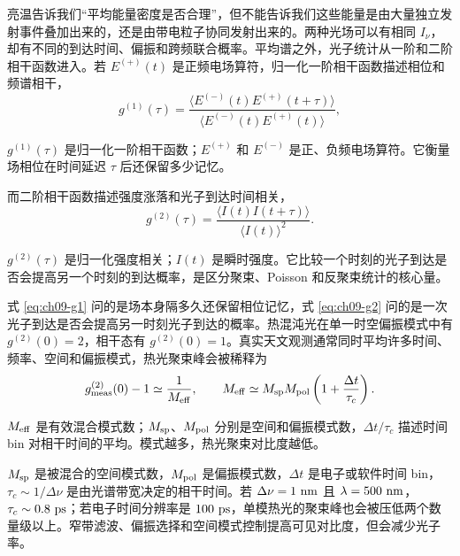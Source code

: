 亮温告诉我们“平均能量密度是否合理”，但不能告诉我们这些能量是由大量独立发射事件叠加出来的，还是由带电粒子协同发射出来的。两种光场可以有相同 \(I_\nu\)，却有不同的到达时间、偏振和跨频联合概率。平均谱之外，光子统计从一阶和二阶相干函数进入。若 \(E^{(+)}(t)\) 是正频电场算符，归一化一阶相干函数描述相位和频谱相干，
\begin{equation}
  g^{(1)}(\tau)=
  \frac{\langle E^{(-)}(t)E^{(+)}(t+\tau)\rangle}
       {\langle E^{(-)}(t)E^{(+)}(t)\rangle},
  \label{eq:ch09-g1}
\end{equation}
\begin{formulaexplain}
\(g^{(1)}(\tau)\) 是归一化一阶相干函数；\(E^{(+)}\) 和 \(E^{(-)}\) 是正、负频电场算符。它衡量场相位在时间延迟 \(\tau\) 后还保留多少记忆。
\end{formulaexplain}
而二阶相干函数描述强度涨落和光子到达时间相关，
\begin{equation}
  g^{(2)}(\tau)=
  \frac{\langle I(t)I(t+\tau)\rangle}{\langle I(t)\rangle^2}.
  \label{eq:ch09-g2}
\end{equation}
\begin{formulaexplain}
\(g^{(2)}(\tau)\) 是归一化强度相关；\(I(t)\) 是瞬时强度。它比较一个时刻的光子到达是否会提高另一个时刻的到达概率，是区分聚束、Poisson 和反聚束统计的核心量。
\end{formulaexplain}
式 \eqref{eq:ch09-g1} 问的是场本身隔多久还保留相位记忆，式 \eqref{eq:ch09-g2} 问的是一次光子到达是否会提高另一时刻光子到达的概率。热混沌光在单一时空偏振模式中有 \(g^{(2)}(0)=2\)，相干态有 \(g^{(2)}(0)=1\)。真实天文观测通常同时平均许多时间、频率、空间和偏振模式，热光聚束峰会被稀释为
\begin{equation}
  g^{(2)}_{\rm meas}(0)-1\simeq \frac{1}{M_{\rm eff}},
  \qquad
  M_{\rm eff}\simeq M_{\rm sp}M_{\rm pol}
  \left(1+\frac{\Delta t}{\tau_c}\right).
  \label{eq:ch09-mode-dilution}
\end{equation}
\begin{formulaexplain}
\(M_{\rm eff}\) 是有效混合模式数；\(M_{\rm sp}\)、\(M_{\rm pol}\) 分别是空间和偏振模式数，\(\Delta t/\tau_c\) 描述时间 bin 对相干时间的平均。模式越多，热光聚束对比度越低。
\end{formulaexplain}
\(M_{\rm sp}\) 是被混合的空间模式数，\(M_{\rm pol}\) 是偏振模式数，\(\Delta t\) 是电子或软件时间 bin，\(\tau_c\sim1/\Delta\nu\) 是由光谱带宽决定的相干时间。若 \(\Delta\nu=1~{\rm nm}\) 且 \(\lambda=500~{\rm nm}\)，\(\tau_c\sim0.8~{\rm ps}\)；若电子时间分辨率是 \(100~{\rm ps}\)，单模热光的聚束峰也会被压低两个数量级以上。窄带滤波、偏振选择和空间模式控制提高可见对比度，但会减少光子率。

